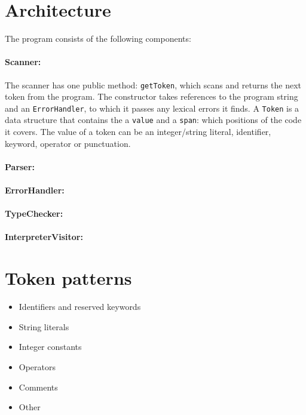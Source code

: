 \documentclass[a4paper]{article}
\newcommand*{\code}[1]{\texttt{#1}}
\begin{document}
\section{Architecture}

The program consists of the following components:

\paragraph*{Scanner:} The scanner has one public method: \code{getToken}, 
which scans and returns the next token from the program. The 
constructor takes references to the program string and an 
\code{ErrorHandler}, to which it passes any lexical errors it finds.
A \code{Token} is a data structure that contains the a \code{value} and 
a \code{span}: which positions of the code it covers.
The value of a token can be an integer/string literal, 
identifier, keyword, operator or punctuation.

\paragraph*{Parser:}

\paragraph*{ErrorHandler:}

\paragraph*{TypeChecker:}

\paragraph*{InterpreterVisitor:}



\section{Token patterns}

\begin{itemize}
  \item Identifiers and reserved keywords
  \item String literals
  \item Integer constants
  \item Operators
  \item Comments
  \item Other
\end{itemize}
\end{document}
